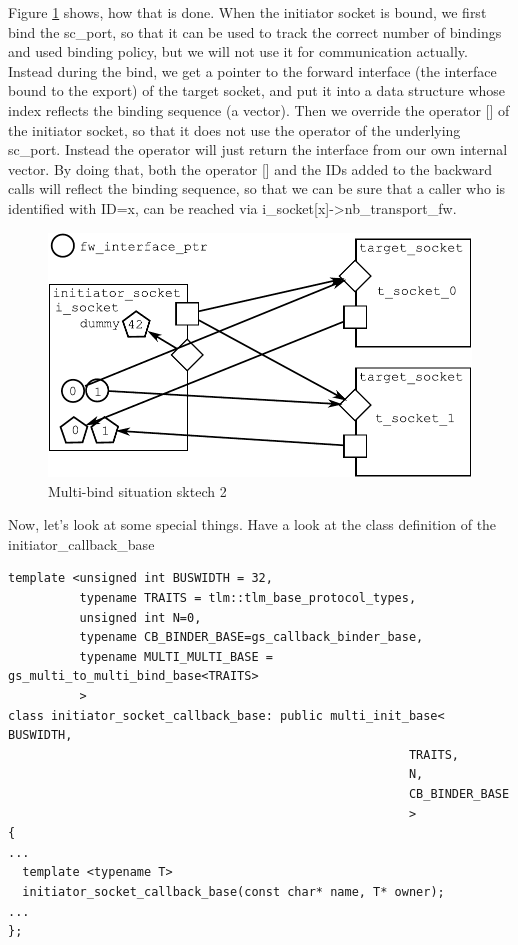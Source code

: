 \documentclass[a4paper,10pt]{article}          %
\newcommand{\code}[1]{{\ttfamily#1}}
\begin{document}
Figure \ref{fig:multib2} shows, how that is done. When the initiator socket is bound, we first bind the \code{sc\_port}, so that it can be used to track the correct number of bindings and used binding policy, but we will not use it for communication actually. Instead during the bind, we get a pointer to the forward interface (the interface bound to the export) of the target socket, and put it into a data structure whose index reflects the binding sequence (a vector). Then we override the \code{operator []} of the initiator socket, so that it does not use the operator of the underlying \code{sc\_port}. Instead the operator will just return the interface from our own internal vector. By doing that, both the \code{operator []} and the IDs added to the backward calls will reflect the binding sequence, so that we can be sure that a caller who is identified with \code{ID=x}, can be reached via \code{i\_socket[x]->nb\_transport\_fw}.

\begin{figure}[htbp]
\begin{center}
\includegraphics[scale=0.7]{multib2}
\caption{Multi-bind situation sktech 2}
\label{fig:multib2}
\end{center}
\end{figure}

Now, let's look at some special things. Have a look at the class definition of the \code{initiator\_callback\_base}


\begin{lstlisting}
template <unsigned int BUSWIDTH = 32,
          typename TRAITS = tlm::tlm_base_protocol_types,
          unsigned int N=0,
          typename CB_BINDER_BASE=gs_callback_binder_base,
          typename MULTI_MULTI_BASE = gs_multi_to_multi_bind_base<TRAITS>
          >
class initiator_socket_callback_base: public multi_init_base< BUSWIDTH, 
                                                        TRAITS,
                                                        N,
                                                        CB_BINDER_BASE
                                                        >
{
...
  template <typename T>
  initiator_socket_callback_base(const char* name, T* owner);
...
};
\end{lstlisting}
\end{document}
